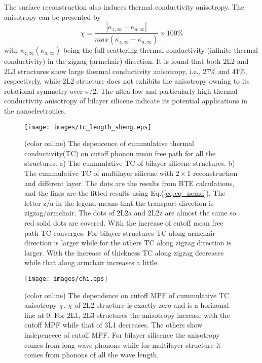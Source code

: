 \documentclass[aps,prb,twocolumn,showpacs,amsmath,amssymb]{revtex4-1}
\begin{document}
The surface reconstruction also induces thermal conductivity anisotropy. The anisotropy can be presented by
\begin{equation}
  \chi=\frac{|\kappa_{z,\infty}-\kappa_{a,\infty} |}{ max⁡(\kappa_{z,\infty}-\kappa_{a,\infty} ) } \times 100 \%  \label{eq:eq_chi}
\end{equation}
with $ \kappa_{z,\infty} (\kappa_{a,\infty})$ being the full scattering thermal conductivity (infinite thermal conductivity) in the zigzag (armchair) direction.
It is found that both 2L2 and 2L3 structures show large thermal conductivity anisotropy, i.e., 27\% and 41\%, respectively, while 2L2 structure does not exhibits the anisotropy owning to its rotational symmetry over $\pi/2$.  The ultra-low and particularly high thermal conductivity anisotropy of bilayer silicene indicate its potential applications in the nanoelectronics.

\begin{figure}[b]
  \texttt{[image: images/tc\_length\_sheng.eps]}
  \caption{\label{fig:tc_length_sheng} (color online) The depencence of cummulative thermal conductivity(TC) on cutoff phonon mean free path for all the structures. a) The cummulative TC of bilayer silicene structures. b) The cummulative TC of multilayer silicene with $2\times 1$ reconstruction and different layer. The dots are the results from BTE calculations, and the lines are the fitted results using Eq.(\ref{eq:eq_nemd}). The letter z/a in the legend means that the transport direction is zigzag/armchair. The dots of 2L2a and 2L2z are almost the same so red solid dots are covered. With the increase of cutoff mean free path TC converges. For bilayer structures TC along armchair direction is larger while for the others TC along zigzag direction is larger. With the increase of thickness TC along zigzag decreases while that along armchair increases a little. }
\end{figure}

\begin{figure}[b]
  \texttt{[image: images/chi.eps]}{}
  \caption{\label{fig:chi} (color online) The dependence on cutoff MPF of cummulative TC anisotropy $\chi$. $\chi$ of 2L2 structure is exactly zero and is a horizonal line at 0. For 2L1, 2L3  structures the anisotropy increase with the cutoff MPF while that of 3L1 decreases. The others show indepencece of cutoff MPF. For bilayer silicence the anisotropy comes from long wave phonons while for multilayer structure it comes from phonons of all the wave length. }
\end{figure}
\end{document}
